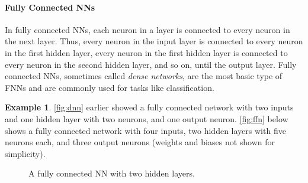 \documentclass[oneside,11pt,dvipsnames]{book}
\numberwithin{equation}{section}
\theoremstyle{definition}
\newtheorem{example}{Example}[section]
\theoremstyle{remark}
\begin{document}
\paragraph{Fully Connected NNs} In fully connected NNs, each neuron in a layer is connected to every neuron in the next layer. Thus, every neuron in the input layer is connected to every neuron in the first hidden layer, every neuron in the first hidden layer is connected to every neuron in the second hidden layer, and so on, until the output layer. Fully connected NNs, sometimes called \emph{dense networks}, are the most basic type of FNNs and are commonly used for tasks like classification. 

\begin{example}
\autoref{fig:dnn} earlier showed a fully connected network with two inputs and one hidden layer with two neurons, and one output neuron. \autoref{fig:ffn} below shows a fully connected network with four inputs, two hidden layers with five neurons each, and three output neurons (weights and biases not shown for simplicity).

\begin{figure}[htp]
    \centering
    \caption{A fully connected NN with two hidden layers.}
    \label{fig:ffn}
\end{figure}
\end{example}
\end{document}
